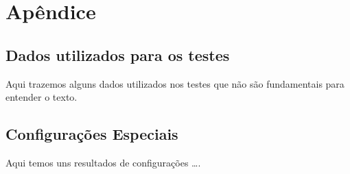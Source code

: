 \chapter{Apêndice}

\section{Dados utilizados para os testes}

Aqui trazemos alguns dados utilizados nos testes que não são fundamentais para entender o texto.

\section{Configurações Especiais}

Aqui temos uns resultados de configurações \dots.

